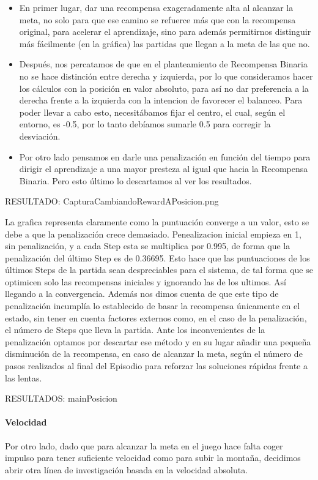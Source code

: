 \begin{itemize}
    \item En primer lugar, dar una recompensa exageradamente alta al alcanzar la meta, no solo para que ese camino se refuerce más que con la recompensa original, para acelerar el aprendizaje, sino para además permitirnos distinguir más fácilmente (en la gráfica) las partidas que llegan a la meta de las que no.  
    \item Después, nos percatamos de que en el planteamiento de Recompensa Binaria no se hace distinción entre derecha y izquierda, por lo que consideramos hacer los cálculos con la posición en valor absoluto, para así no dar preferencia a la derecha frente a la izquierda con la intencion de favorecer el balanceo.
     Para poder llevar a cabo esto, necesitábamos fijar el centro, el cual, según el entorno, es -0.5, por lo tanto debíamos sumarle 0.5 para corregir la desviación.
    \item Por otro lado pensamos en darle una penalización en función del tiempo para dirigir el aprendizaje a una mayor presteza al igual que hacia la Recompensa Binaria. Pero esto último lo descartamos al ver los resultados.
\end{itemize}
 RESULTADO: CapturaCambiandoRewardAPosicion.png

La grafica representa claramente como la puntuación converge a un valor, esto se debe a que la penalización crece demasiado.
Penealizacion inicial empieza en 1, sin penalización, y a cada Step esta se multiplica por 0.995, de forma que la penalización del último Step es de 0.36695. Esto hace que las puntuaciones de los últimos Steps de la partida sean despreciables para el sistema, de tal forma que se optimicen solo las recompensas iniciales y ignorando las de los ultimos. Así llegando a la convergencia. 
Además nos dimos cuenta de que este tipo de penalización incumplía lo establecido de basar la recompensa únicamente en el estado, sin tener en cuenta factores externos como, en el caso de la penalización, el número de Steps que lleva la partida.
Ante los inconvenientes de la penalización optamos por descartar ese método y en su lugar añadir una pequeña disminución de la recompensa, en caso de alcanzar la meta, según el número de pasos realizados al final del Episodio para reforzar las soluciones rápidas frente a las lentas.

RESULTADOS: mainPosicion

\paragraph{Velocidad}
Por otro lado, dado que para alcanzar la meta en el juego hace falta coger impulso para tener suficiente velocidad como para subir la montaña, decidimos abrir otra línea de investigación basada en la velocidad absoluta.

